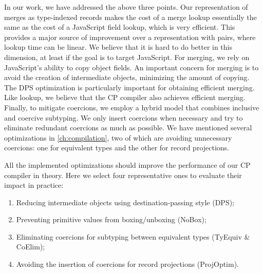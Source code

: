 \noindent
In our work, we have addressed the above three points. Our representation of
merges as type-indexed records makes the cost of a merge lookup essentially the
same as the cost of a JavaScript field lookup, which is very efficient. This
provides a major source of improvement over a representation with pairs, where
lookup time can be linear. We believe that it is hard to do better in this
dimension, at least if the goal is to target JavaScript. For merging, we rely on
JavaScript's ability to copy object fields. An important concern for merging is
to avoid the creation of intermediate objects, minimizing the amount of copying.
The DPS optimization is particularly important for obtaining efficient merging.
Like lookup, we believe that the CP compiler also achieves efficient merging.
Finally, to mitigate coercions, we employ a hybrid model that combines inclusive
and coercive subtyping. We only insert coercions when necessary and try to
eliminate redundant coercions as much as possible. We have mentioned several
optimizations in \autoref{ch:compilation}, two of which are avoiding unnecessary
coercions: one for equivalent types and the other for record projections.

All the implemented optimizations should improve the performance of our CP
compiler in theory. Here we select four representative ones to evaluate their
impact in practice:
\begin{enumerate}
\item Reducing intermediate objects using destination-passing style (\textsf{DPS});
\item Preventing primitive values from boxing/unboxing (\textsf{NoBox});
\item Eliminating coercions for subtyping between equivalent types (\textsf{TyEquiv} \& \textsf{CoElim});
\item Avoiding the insertion of coercions for record projections (\textsf{ProjOptim}).
\end{enumerate}

